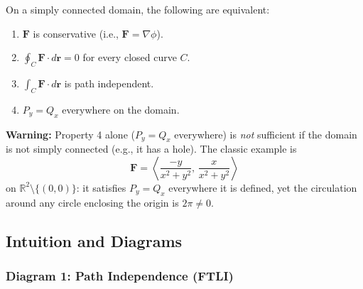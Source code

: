 \documentclass[11pt]{article}
\begin{document}
On a simply connected domain, the following are equivalent:
\begin{enumerate}
  \item $\mathbf{F}$ is conservative (i.e., $\mathbf{F} = \nabla\phi$).
  \item $\oint_C \mathbf{F}\cdot d\mathbf{r} = 0$ for every closed curve $C$.
  \item $\int_C \mathbf{F}\cdot d\mathbf{r}$ is path independent.
  \item $P_y = Q_x$ everywhere on the domain.
\end{enumerate}

\textbf{Warning:} Property 4 alone ($P_y = Q_x$ everywhere) is \emph{not} sufficient if the domain is not simply connected (e.g., it has a hole). The classic example is
\[
  \mathbf{F} = \left\langle \frac{-y}{x^2+y^2},\,\frac{x}{x^2+y^2} \right\rangle
\]
on $\mathbb{R}^2 \setminus \{(0,0)\}$: it satisfies $P_y = Q_x$ everywhere it is defined, yet the circulation around any circle enclosing the origin is $2\pi \ne 0$.

\subsection{Intuition and Diagrams}

\subsubsection*{Diagram 1: Path Independence (FTLI)}
\end{document}
